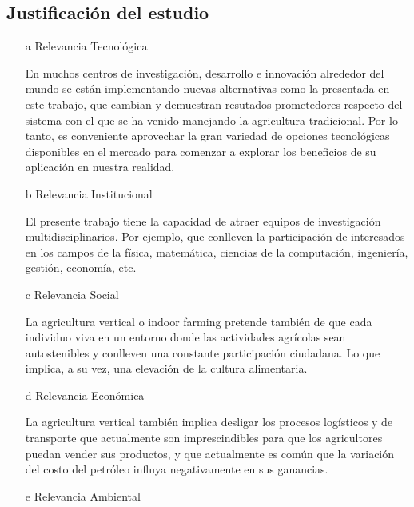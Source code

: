 \documentclass{report}
\begin{document}
\subsection{Justificación del estudio}
\begin{enumerate}
\item[a] Relevancia Tecnológica
  
  En muchos centros de investigación, desarrollo e innovación alrededor del
  mundo se están implementando nuevas alternativas como la presentada en este
  trabajo, que cambian y demuestran resutados prometedores respecto del sistema
  con el que se ha venido manejando la agricultura tradicional. Por lo tanto, es
  conveniente aprovechar la gran variedad de opciones tecnológicas disponibles
  en el mercado para comenzar a explorar los beneficios de su aplicación en
  nuestra realidad.
  
\item[b] Relevancia Institucional
  
  El presente trabajo tiene la capacidad de atraer equipos de investigación
  multidisciplinarios. Por ejemplo, que conlleven la participación de
  interesados en los campos de la física, matemática, ciencias de la
  computación, ingeniería, gestión, economía, etc.
  
\item[c] Relevancia Social
  
  La agricultura vertical o indoor farming pretende también de que cada
  individuo viva en un entorno donde las actividades agrícolas sean
  autostenibles y conlleven una constante participación ciudadana. Lo que
  implica, a su vez, una elevación de la cultura alimentaria.
  
\item[d] Relevancia Económica
  
  La agricultura vertical también implica desligar los procesos logísticos y de
  transporte que actualmente son imprescindibles para que los agricultores
  puedan vender sus productos, y que actualmente es común que la variación del
  costo del petróleo influya negativamente en sus ganancias.
  
\item[e] Relevancia Ambiental
  

\end{enumerate}
\end{document}
